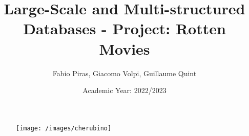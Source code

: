 

\author{Fabio Piras, Giacomo Volpi, Guillaume Quint}
\title{Large-Scale and Multi-structured Databases - Project: Rotten Movies}
\date{Academic Year: 2022/2023}


\begin{figure}
\centering
\texttt{[image: /images/cherubino]}

\end{figure}

\maketitle


\newpage

\tableofcontents






















